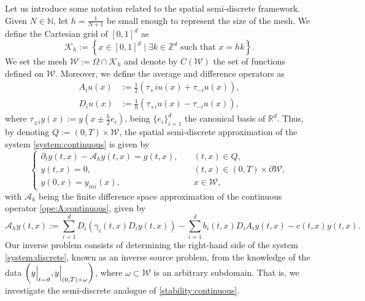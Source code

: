 \documentclass{amsart}
\numberwithin{equation}{section}
\begin{document}
Let us introduce some notation related to the spatial semi-discrete framework.  Given $N\in\mathbb{N}$, let $h=\frac{1}{N+1}$ be small enough to represent the size of the mesh. We define the Cartesian grid of $[0,1]^{d}$ as
\begin{equation}\label{mesh}
    \mathcal{K}_{h}:= \left\{x\in [0,1]^{d}\mid \exists k\in\mathbb{Z}^{d} \text{ such that }x=hk  \right\}.
\end{equation} 
We set the mesh $\mathcal{W}:= \Omega\cap \mathcal{K}_{h}$ and denote by $C(\mathcal{W})$ the set of functions defined on $\mathcal{W}$. 
Moreover, we define the average and difference operators as 
\begin{equation}\label{op:difference:average}
\begin{split}
    A_{i}u(x)&:= \frac{1}{2}\left(\tau_{+}i u(x)+\tau_{-i}u(x)\right),\\
    D_{i}u(x)&:= \frac{1}{h}\left(\tau_{+i}u(x)-\tau_{-i}u(x) \right),
    \end{split}
\end{equation}
where $\tau_{\pm i}y(x):= y(x\pm \frac h2 e_{i})$, being $\{e_{i}\}_{i=1}^{d}$ the canonical basis of $\mathbb{R}^{d}$. Thus, by denoting $Q:= (0,T)\times\mathcal{W}$, the spatial semi-discrete approximation of the system \eqref{system:continuous} is given by
\begin{equation}\label{system:discrete}
\begin{cases}
    \partial_{t}y(t,x)-\mathcal{A}_{h}y(t,x)=g(t,x),\quad &(t,x)\in Q,\\
    y(t,x)=0,  &(t,x)\in(0,T)\times\partial\mathcal{W},\\
    y(0,x)=y_{ini}(x), &x\in\mathcal{W},
\end{cases}
\end{equation}
with $\mathcal{A}_{h}$ being the finite difference space approximation of the continuous operator \eqref{ope:A:continuous}, given by
\begin{equation}
\mathcal{A}_{h}y(t,x):= \sum_{i=1}^{d}D_{i}\left(\gamma_{i}(t,x)D_{i}y(t,x)\right)-\sum_{i=1}^{d}b_i(t,x)D_{i}A_{i}y(t,x)-c(t,x)y(t,x).
\end{equation}
Our inverse problem consists of determining the right-hand side of the system \eqref{system:discrete}, known as an inverse source problem, from the knowledge of the data $\left(y\Bigr|_{t=\vartheta},\Bigl.y\Bigr|_{(0,T)\times \omega}\right)$, where $\omega\subset\mathcal{W}$ is an arbitrary subdomain. That is, we investigate the semi-discrete analogue of \eqref{stability:continuous}. 
\end{document}

